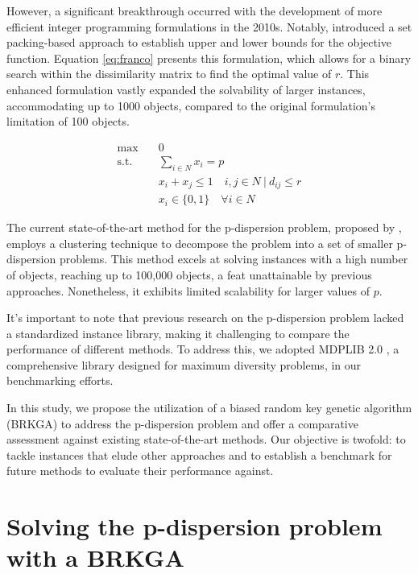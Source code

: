 \documentclass[preprint,12pt]{elsarticle}
\begin{document}
However, a significant breakthrough occurred with the development of more efficient integer programming formulations in the 2010s. Notably,\citet{franco2015solving} introduced a set packing-based approach to establish upper and lower bounds for the objective function. Equation \ref{eq:franco} presents this formulation, which allows for a binary search within the dissimilarity matrix to find the optimal value of $r$. This enhanced formulation vastly expanded the solvability of larger instances, accommodating up to 1000 objects, compared to the original formulation's limitation of 100 objects.

\begin{equation}
    \label{eq:franco}
    \begin{aligned}
        \max \quad & 0 \\
        \text{s.t.} \quad & \sum_{i \in N} x_i = p \\
        & x_i + x_j \leq 1 \quad i,j \in N \ |\  d_{ij} \leq r \\
        & x_i \in \{0,1\} \quad \forall i \in N
    \end{aligned}
\end{equation}

The current state-of-the-art method for the p-dispersion problem, proposed by \citet{Contardo2020-vn}, employs a clustering technique to decompose the problem into a set of smaller p-dispersion problems. This method excels at solving instances with a high number of objects, reaching up to 100,000 objects, a feat unattainable by previous approaches. Nonetheless, it exhibits limited scalability for larger values of $p$.

It's important to note that previous research on the p-dispersion problem lacked a standardized instance library, making it challenging to compare the performance of different methods. To address this, we adopted MDPLIB 2.0 \citep{marti2021mdplib}, a comprehensive library designed for maximum diversity problems, in our benchmarking efforts.

In this study, we propose the utilization of a biased random key genetic algorithm (BRKGA) \citep{Goncalves2011-kp} to address the p-dispersion problem and offer a comparative assessment against existing state-of-the-art methods. Our objective is twofold: to tackle instances that elude other approaches and to establish a benchmark for future methods to evaluate their performance against.
\section{Solving the p-dispersion problem with a BRKGA}
\label{sec:brkga}
\end{document}
